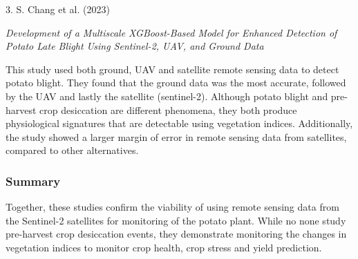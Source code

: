 3. S. Chang et al. (2023)

\textit{Development of a Multiscale XGBoost-Based Model for Enhanced Detection of Potato Late Blight Using Sentinel-2, UAV, and Ground Data}

This study used both ground, UAV and satellite remote sensing data to detect potato blight. They found that the ground data was the most accurate, followed by the UAV and lastly the satellite (sentinel-2)\cite{yang2023nitrogen}. Although potato blight and pre-harvest crop desiccation are different phenomena, they both produce physiological signatures that are detectable using vegetation indices. Additionally, the study showed a larger margin of error in remote sensing data from satellites, compared to other alternatives.

\subsubsection{Summary}
Together, these studies confirm the viability of using remote sensing data from the Sentinel-2 satellites for monitoring of the potato plant. While no none study pre-harvest crop desiccation events, they demonstrate monitoring the changes in vegetation indices to monitor crop health, crop stress and yield prediction.

